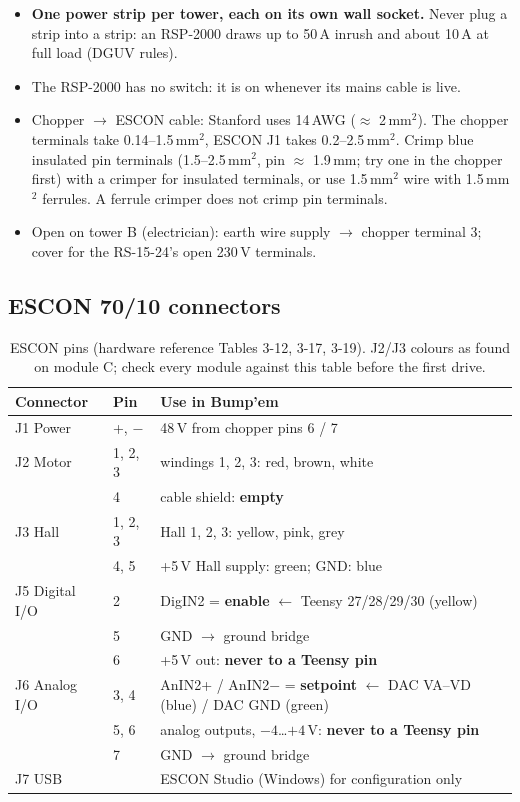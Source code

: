 \begin{itemize}
\item \textbf{One power strip per tower, each on its own wall socket.} Never plug a strip into a strip: an
RSP-2000 draws up to 50\,A inrush and about 10\,A at full load (DGUV rules).
\item The RSP-2000 has no switch: it is on whenever its mains cable is live.
\item Chopper $\rightarrow$ ESCON cable: Stanford uses 14\,AWG ($\approx$ 2\,mm$^2$). The chopper terminals take
0.14--1.5\,mm$^2$, ESCON J1 takes 0.2--2.5\,mm$^2$. Crimp blue insulated pin terminals (1.5--2.5\,mm$^2$,
pin $\approx$ 1.9\,mm; try one in the chopper first) with a crimper for insulated terminals, or use 1.5\,mm$^2$
wire with 1.5\,mm$^2$ ferrules. A ferrule crimper does not crimp pin terminals.
\item Open on tower B (electrician): earth wire supply $\rightarrow$ chopper terminal 3; cover for the
RS-15-24's open 230\,V terminals.
\end{itemize}

\subsection{ESCON 70/10 connectors}

\begin{table}[H]\centering\small
\begin{tabularx}{\linewidth}{llX}
\toprule
Connector & Pin & Use in Bump'em \\
\midrule
J1 Power & +, $-$ & 48\,V from chopper pins 6 / 7 \\
J2 Motor & 1, 2, 3 & windings 1, 2, 3: red, brown, white \\
         & 4 & cable shield: \textbf{empty} \\
J3 Hall  & 1, 2, 3 & Hall 1, 2, 3: yellow, pink, grey \\
         & 4, 5 & +5\,V Hall supply: green; GND: blue \\
J5 Digital I/O & 2 & DigIN2 = \textbf{enable} $\leftarrow$ Teensy 27/28/29/30 (yellow) \\
               & 5 & GND $\rightarrow$ ground bridge \\
               & 6 & +5\,V out: \textbf{never to a Teensy pin} \\
J6 Analog I/O  & 3, 4 & AnIN2+ / AnIN2$-$ = \textbf{setpoint} $\leftarrow$ DAC VA--VD (blue) / DAC GND (green) \\
               & 5, 6 & analog outputs, $-4$\ldots$+4$\,V: \textbf{never to a Teensy pin} \\
               & 7 & GND $\rightarrow$ ground bridge \\
J7 USB & & ESCON Studio (Windows) for configuration only \\
\bottomrule
\end{tabularx}
\caption{ESCON pins (hardware reference Tables 3-12, 3-17, 3-19). J2/J3 colours as found on module C;
check every module against this table before the first drive.}
\end{table}

